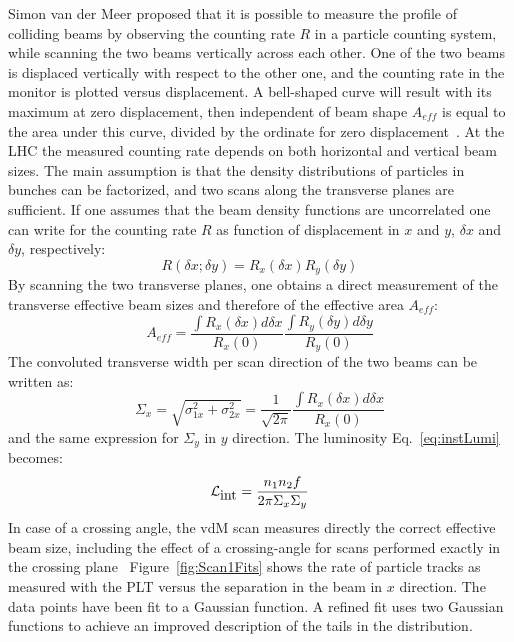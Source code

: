 Simon van der Meer proposed that it is possible to measure the profile of colliding beams
by observing the counting rate $R$ in a particle counting system, while scanning the two
beams vertically across each other. One of the two beams is displaced vertically with respect 
to the other one, and the counting rate in the monitor is plotted versus displacement.
A bell-shaped curve will result with its maximum at zero displacement, then independent  of beam shape $A_{eff}$ is equal to the area under this curve,
divided by the ordinate for zero displacement~\cite{vanderMeer:296752}.
%
At the LHC the measured counting rate
depends on both horizontal and vertical beam sizes. The main assumption is that the 
density distributions of particles in bunches can be factorized, and two scans along
the transverse planes are sufficient. If one assumes that the beam density functions 
are uncorrelated one can write for the counting rate $R$ as function of displacement
in $x$ and $y$, $\delta x$ and $\delta y$, respectively:
\begin{equation}
R(\delta x;\delta y) = R_x(\delta x) R_y(\delta y)
\end{equation}
By scanning the two transverse planes, one obtains a direct measurement of the transverse
effective beam sizes and therefore of the effective area $A_{eff}$:
\begin{equation}
A_{eff} = \frac{\int R_x(\delta x) d\delta x}{R_x(0)} \frac{\int R_y(\delta y) d\delta y}{R_y(0)}
\end{equation}
The convoluted transverse width per scan direction of the two beams can be written as:
\begin{equation}
\Sigma_x = \sqrt{\sigma_{1x}^2+\sigma_{2x}^2} = \frac{1}{\sqrt{2\pi}}\frac{\int R_x(\delta x) d\delta x}{R_x(0)} 
\end{equation}  
and the same expression for $\Sigma_y$ in $y$ direction. The luminosity Eq.~\ref{eq:instLumi} becomes:
\begin{equation}
{\cal L}_{\mbox{int}} = \frac{n_1 n_2 f}{2\pi \Sigma_x \Sigma_y} 
\end{equation}
In case of a crossing angle, the vdM scan measures directly the correct effective
beam size, including the effect of a crossing-angle for scans performed exactly in the
crossing plane~\cite{White:1308187}
%
Figure~\ref{fig:Scan1Fits} shows the rate of particle tracks as measured with the PLT versus
the separation in the beam in $x$ direction. The data points have been fit to a Gaussian 
function. A refined fit uses two Gaussian functions to achieve an improved description
of the tails in the distribution.

